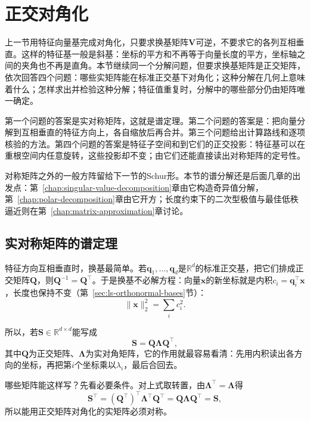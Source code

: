 
\section{正交对角化}
\label{sec:ls-spectral-theory}

上一节用特征向量基完成对角化，只要求换基矩阵$\bm V$可逆，不要求它的各列互相垂直。这样的特征基一般是斜基：坐标的平方和不再等于向量长度的平方，坐标轴之间的夹角也不再是直角。本节继续同一个分解问题，但要求换基矩阵是正交矩阵，依次回答四个问题：哪些实矩阵能在标准正交基下对角化；这种分解在几何上意味着什么；怎样求出并检验这种分解；特征值重复时，分解中的哪些部分仍由矩阵唯一确定。

第一个问题的答案是实对称矩阵，这就是谱定理。第二个问题的答案是：把向量分解到互相垂直的特征方向上，各自缩放后再合并。第三个问题给出计算路线和逐项核验的方法。第四个问题的答案是特征子空间和到它们的正交投影：特征基可以在重根空间内任意旋转，这些投影却不变；由它们还能直接读出对称矩阵的定号性。

对称矩阵之外的一般方阵留给下一节的Schur形。本节的谱分解还是后面几章的出发点：第~\ref{chap:singular-value-decomposition}章由它构造奇异值分解，第~\ref{chap:polar-decomposition}章由它开方；长度约束下的二次型极值与最佳低秩逼近则在第~\ref{chap:matrix-approximation}章讨论。

\subsection{实对称矩阵的谱定理}
\label{sec:ls-symmetric-spectral-decomposition}

特征方向互相垂直时，换基最简单。若$\bm q_1,\ldots,\bm q_d$是$\mathbb R^d$的标准正交基，把它们排成正交矩阵$\bm Q$，则$\bm Q^{-1}=\bm Q^\top$。于是换基不必解方程：向量$\bm x$的新坐标就是内积$c_i=\bm q_i^\top\bm x$，长度也保持不变（第~\ref{sec:ls-orthonormal-bases}节）：
\[
 \lVert\bm x\rVert_2^2=\sum_ic_i^2 .
\]

所以，若$\bm S\in\mathbb R^{d\times d}$能写成
\[
 \bm S=\bm Q\bm\Lambda\bm Q^\top,
\]
其中$\bm Q$为正交矩阵、$\bm\Lambda$为实对角矩阵，它的作用就最容易看清：先用内积读出各方向的坐标，再把第$i$个坐标乘以$\lambda_i$，最后合回去。

哪些矩阵能这样写？先看必要条件。对上式取转置，由$\bm\Lambda^\top=\bm\Lambda$得
\[
 \bm S^\top=(\bm Q^\top)^\top\bm\Lambda^\top\bm Q^\top=\bm Q\bm\Lambda\bm Q^\top=\bm S,
\]
所以能用正交矩阵对角化的实矩阵必须对称。

